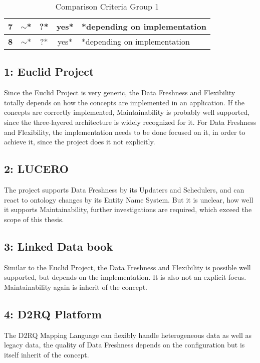 \begin{table}[htbp]
{\begin{tabular}{|c|c|c|c|l|}
\textbf{7}  & $\sim$*                                                               & ?*                                                                   & yes*                                                              & *depending on implementation     \\ \hline
\textbf{8}  & $\sim$*                                                               & ?*                                                                   & yes*                                                              & *depending on implementation     \\ \hline
\end{tabular}
}
\caption{Comparison Criteria Group 1}
\label{tbl_comp_gr_1}
\end{table}

\subsection*{1: Euclid Project} 
Since the Euclid Project is very generic, the Data Freshness and Flexibility totally depends on how the concepts are implemented in an application. If the concepts are correctly implemented, Maintainability is probably well supported, since the three-layered architecture is widely recognized for it. For Data Freshness and Flexibility, the implementation needs to be done focused on it, in order to achieve it, since the project does it not explicitly.

\subsection*{2: LUCERO}
The project supports Data Freshness by its Updaters and Schedulers, and can react to ontology changes by its Entity Name System. But it is unclear, how well it supports Maintainability, further investigations are required, which exceed the scope of this thesis.

\subsection*{3: Linked Data book}
Similar to the Euclid Project, the Data Freshness and Flexibility is possible well supported, but depends on the implementation. It is also not an explicit focus. Maintainability again is inherit of the concept.

\subsection*{4: D2RQ Platform}
The D2RQ Mapping Language can flexibly handle heterogeneous data as well as legacy data, the quality of Data Freshness depends on the configuration but is itself inherit of the concept.

